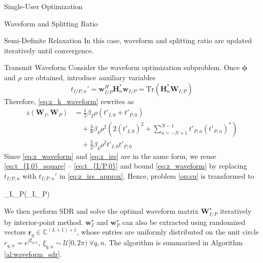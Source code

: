 \documentclass{IEEEtran}
\begin{document}
\begin{section}{Single-User Optimization}
\begin{subsection}{Waveform and Splitting Ratio}
		\begin{subsubsection}{Semi-Definite Relaxation}
			In this case, waveform and splitting ratio are updated iteratively until convergence.
			\begin{paragraph}{Transmit Waveform}
				Consider the waveform optimization subproblem. Once $\boldsymbol{\phi}$ and $\rho$ are obtained, introduce auxiliary variables
				\begin{equation}\label{eq:t'}
					t_{I/P,n}' = \boldsymbol{w}_{I/P}^H \boldsymbol{H}_n^* \boldsymbol{w}_{I/P} = \mathrm{Tr}(\boldsymbol{H}_n^*\boldsymbol{W}_{I/P})
				\end{equation}
				Therefore, \ref{eq:z_k_waveform} rewrites as
				\begin{equation}\label{eq:z_waveform}
					\begin{split}
						z(\boldsymbol{W}_I,\boldsymbol{W}_P)
						&=\frac{1}{2} \beta_2 \rho (t'_{I,0}+t'_{P,0})\\
						&\quad+\frac{3}{8} \beta_4 \rho^2 \left(2(t'_{I,0})^2 + \sum_{n=-N+1}^{N-1}{t'_{P,n}(t'_{P,n})^*}\right)\\
						&\quad+\frac{3}{2} \beta_4 \rho^2 t'_{I,0}t'_{P,0}
					\end{split}
				\end{equation}
				Since \ref{eq:z_waveform} and \ref{eq:z_irs} are in the same form, we reuse \ref{eq:t_{I,0}_square} -- \ref{eq:t_{I/P,0}} and bound \ref{eq:z_waveform} by replacing $t_{I/P,n}$ with $t_{I/P,n}'$ in \ref{eq:z_irs_approx}. Hence, problem \ref{op:su} is transformed to
				\begin{maxi!}
					{\boldsymbol{W}_I,_P}{(_I,_P)}{\label{op:su_waveform}}{\label{eq:su_waveform_target}}
				\end{maxi!}
				We then perform SDR and solve the optimal waveform matrix $\boldsymbol{W}_{I/P}^{\star}$ iteratively by interior-point method. $\boldsymbol{w}_I^{\star}$ and $\boldsymbol{w}_P^{\star}$ can also be extracted using randomized vectors $\boldsymbol{r}_q \in \mathbb{C}^{(L+1) \times 1}$, whose entries are uniformly distributed on the unit circle $r_{q,n}=e^{j\xi_{q,n}}, \ \xi_{q,n} \sim \mathcal{U}[0,2\pi) \ \forall q, n$. The algorithm is summarized in Algorithm \ref{al:waveform_sdr}.

\end{paragraph}
\end{subsubsection}
\end{subsection}
\end{section}
\end{document}
